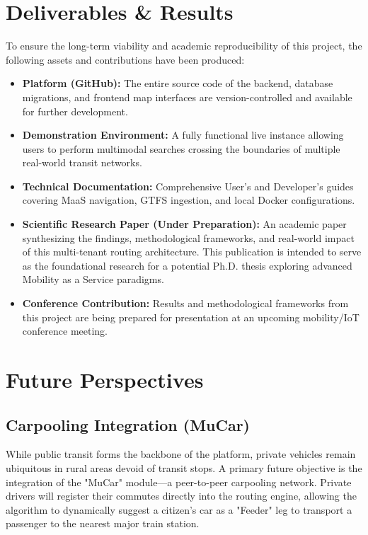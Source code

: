 \documentclass[12pt,a4paper]{article}
\begin{document}
\newpage

\section{Deliverables \& Results}

To ensure the long-term viability and academic reproducibility of this project, the following assets and contributions have been produced:

\begin{itemize}[leftmargin=2em]
    \item \textbf{Platform (GitHub):} The entire source code of the backend, database migrations, and frontend map interfaces are version-controlled and available for further development.
    \item \textbf{Demonstration Environment:} A fully functional live instance allowing users to perform multimodal searches crossing the boundaries of multiple real-world transit networks.
    \item \textbf{Technical Documentation:} Comprehensive User's and Developer's guides covering MaaS navigation, GTFS ingestion, and local Docker configurations.
    \item \textbf{Scientific Research Paper (Under Preparation):} An academic paper synthesizing the findings, methodological frameworks, and real-world impact of this multi-tenant routing architecture. This publication is intended to serve as the foundational research for a potential Ph.D. thesis exploring advanced Mobility as a Service paradigms.
    \item \textbf{Conference Contribution:} Results and methodological frameworks from this project are being prepared for presentation at an upcoming mobility/IoT conference meeting.
\end{itemize}

\section{Future Perspectives}

\subsection{Carpooling Integration (MuCar)}
While public transit forms the backbone of the platform, private vehicles remain ubiquitous in rural areas devoid of transit stops. A primary future objective is the integration of the "MuCar" module—a peer-to-peer carpooling network. Private drivers will register their commutes directly into the routing engine, allowing the algorithm to dynamically suggest a citizen's car as a "Feeder" leg to transport a passenger to the nearest major train station.
\end{document}
